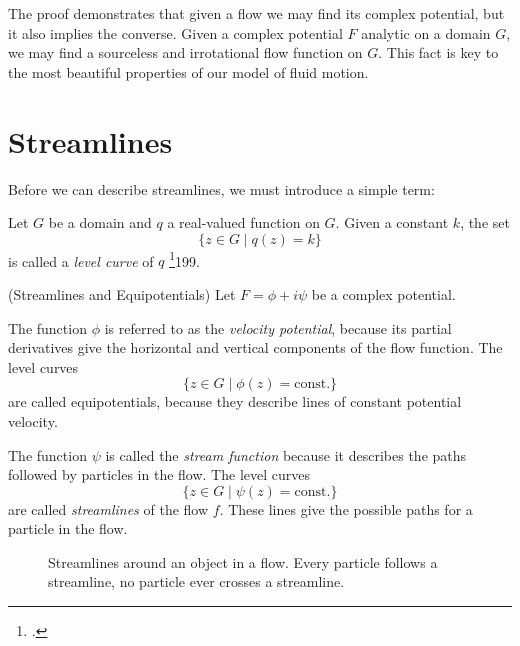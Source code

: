 \documentclass[letterpaper, twoside, 12 pt]{article}
\begin{document}
	\begin{remark}
		The proof demonstrates that given a flow we may find its complex potential, but it also implies the converse.
		Given a complex potential $F$ analytic on a domain $G$, we may find a sourceless and irrotational flow function on $G$.
		This fact is key to the most beautiful properties of our model of fluid motion.
	\end{remark}



\section{Streamlines} %
\label{sec:streamlines}

	Before we can describe streamlines, we must introduce a simple term:\
	\begin{definition}
		Let $G$ be a domain and $q$ a real-valued function on $G$.
		Given a constant $k$, the set 
		\[
			\{ z \in G \mid q(z) = k \}
		\]
		is called a \textit{level curve} of $q$ \footcite{fisher}{199}.
	\end{definition}

	\begin{definition}(Streamlines and Equipotentials)
		Let $F = \phi + i \psi$ be a complex potential.

		The function $\phi$ is referred to as the \textit{velocity potential}, because its partial derivatives give the horizontal and vertical components of the flow function.
		The level curves 
		\[
			\{ z \in G \mid \phi(z) = \mathrm{const.} \}
		\]
		are called equipotentials, because they describe lines of constant potential velocity.

		The function $\psi$ is called the \textit{stream function} because it describes the paths followed by particles in the flow.
		The level curves 
		\[
			\{ z \in G \mid \psi(z) = \mathrm{const.} \}
		\]
		are called \textit{streamlines} of the flow $f$.
		These lines give the possible paths for a particle in the flow.
	\end{definition}

	\begin{figure}[H]
		\centering
		\begin{tikzpicture}
			
		\end{tikzpicture}
		\captionsetup{width = 0.5 \textwidth}
		\caption{
			Streamlines around an object in a flow.
			Every particle follows a streamline, no particle ever crosses a streamline.
		}
		\label{fig:streamlines}
	\end{figure}
\end{document}
